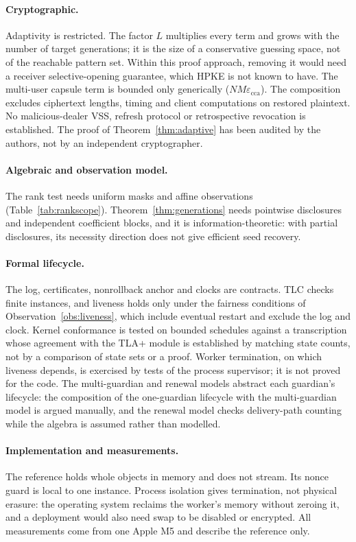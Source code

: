 \documentclass[pdflatex,sn-mathphys-num]{sn-jnl}%
\theoremstyle{plain}
\theoremstyle{definition}
\begin{document}
\paragraph{Cryptographic.}
Adaptivity is restricted. The factor $L$ multiplies every term and grows with the number of target generations; it is the size of a conservative guessing space, not of the reachable pattern set. Within this proof approach, removing it would need a receiver selective-opening guarantee, which HPKE is not known to have. The multi-user capsule term is bounded only generically ($NM\varepsilon_{\mathrm{cca}}$). The composition excludes ciphertext lengths, timing and client computations on restored plaintext. No malicious-dealer VSS, refresh protocol or retrospective revocation is established. The proof of Theorem~\ref{thm:adaptive} has been audited by the authors, not by an independent cryptographer.

\paragraph{Algebraic and observation model.}
The rank test needs uniform masks and affine observations (Table~\ref{tab:rankscope}). Theorem~\ref{thm:generations} needs pointwise disclosures and independent coefficient blocks, and it is information-theoretic: with partial disclosures, its necessity direction does not give efficient seed recovery.

\paragraph{Formal lifecycle.}
The log, certificates, nonrollback anchor and clocks are contracts. TLC checks finite instances, and liveness holds only under the fairness conditions of Observation~\ref{obs:liveness}, which include eventual restart and exclude the log and clock. Kernel conformance is tested on bounded schedules against a transcription whose agreement with the TLA+ module is established by matching state counts, not by a comparison of state sets or a proof. Worker termination, on which liveness depends, is exercised by tests of the process supervisor; it is not proved for the code. The multi-guardian and renewal models abstract each guardian's lifecycle: the composition of the one-guardian lifecycle with the multi-guardian model is argued manually, and the renewal model checks delivery-path counting while the algebra is assumed rather than modelled.

\paragraph{Implementation and measurements.}
The reference holds whole objects in memory and does not stream. Its nonce guard is local to one instance. Process isolation gives termination, not physical erasure: the operating system reclaims the worker's memory without zeroing it, and a deployment would also need swap to be disabled or encrypted. All measurements come from one Apple M5 and describe the reference only.
\end{document}
